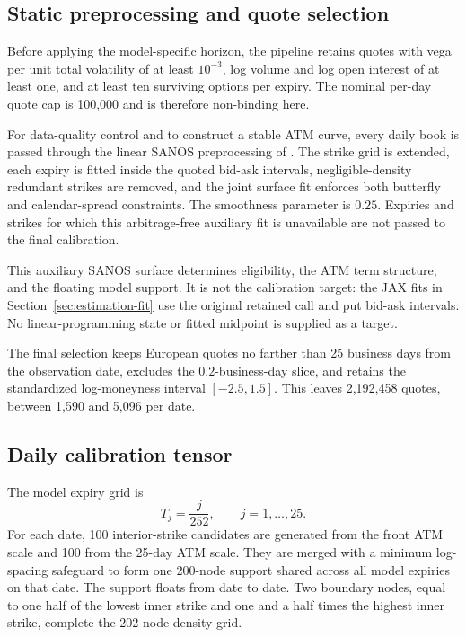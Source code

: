 \subsection{Static preprocessing and quote selection}
\label{app:pipeline-static}

Before applying the model-specific horizon, the pipeline retains quotes with
vega per unit total volatility of at least $10^{-3}$, log volume and log open
interest of at least one, and at least ten surviving options per expiry. The
nominal per-day quote cap is 100,000 and is therefore non-binding here.

For data-quality control and to construct a stable ATM curve, every daily book
is passed through the linear SANOS preprocessing of \cite{SANOS2026}. The
strike grid is extended, each expiry is fitted inside the quoted bid-ask
intervals, negligible-density redundant strikes are removed, and the joint
surface fit enforces both butterfly and calendar-spread constraints. The
smoothness parameter is $0.25$. Expiries and strikes for which this
arbitrage-free auxiliary fit is unavailable are not passed to the final
calibration.

This auxiliary SANOS surface determines eligibility, the ATM term structure,
and the floating model support. It is not the calibration target: the JAX fits
in Section~\ref{sec:estimation-fit} use the original retained call and put
bid-ask intervals. No linear-programming state or fitted midpoint is supplied
as a target.

The final selection keeps European quotes no farther than 25 business days
from the observation date, excludes the $0.2$-business-day slice, and retains
the standardized log-moneyness interval $[-2.5,1.5]$. This leaves 2,192,458
quotes, between 1,590 and 5,096 per date.

\subsection{Daily calibration tensor}
\label{app:pipeline-tensor}

The model expiry grid is
\[
  T_j=\frac{j}{252},\qquad j=1,\ldots,25.
\]
For each date, 100 interior-strike candidates are generated from the front
ATM scale and 100 from the 25-day ATM scale. They are merged with a minimum
log-spacing safeguard to form one 200-node support shared across all model
expiries on that date. The support floats from date to date. Two boundary
nodes, equal to one half of the lowest inner strike and one and a half times
the highest inner strike, complete the 202-node density grid.

